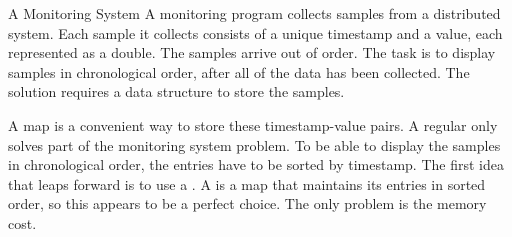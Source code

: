 







 \begin{example}{A Monitoring System}
   A monitoring program collects samples from a distributed
   system. Each sample it collects consists of a unique timestamp and a
   value, each represented as a double. The samples arrive out of
   order. The task is to display samples in chronological order, after
   all of the data has been collected. The solution requires a data
   structure to store the samples. 
\end{example}

A map is a convenient way to store these timestamp-value pairs. A regular
 only solves part of the monitoring system problem. To be able
to display the samples in chronological order, the entries have to be sorted by
timestamp.
The first idea that leaps forward is to use a . A
 is a map that maintains its entries in sorted order, so this
appears to be a perfect choice. The only problem is the memory cost.

